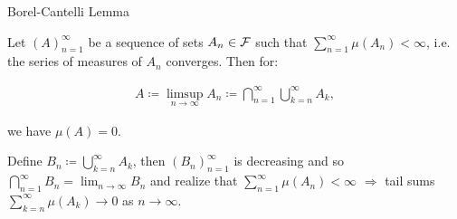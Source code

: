 \begin{lemma}{4.4}{Borel-Cantelli Lemma}

    Let $(A)_{n=1}^{\infty}$ be a sequence of sets $A_n \in \mathcal{F}$ such that $\sum_{n=1}^{\infty} \mu(A_n) < \infty$, i.e. the series of measures of $A_n$ converges. Then for:

        \begin{align*}
            A \coloneqq \limsup_{n \to \infty} A_n \coloneqq \bigcap_{n=1}^{\infty} \bigcup_{k=n}^{\infty} A_k,
        \end{align*}

    we have $\mu(A) = 0$.

    \Hint Define $B_n \coloneqq \bigcup_{k=n}^{\infty} A_k$, then $(B_n)_{n=1}^\infty$ is decreasing and so $\bigcap_{n=1}^{\infty} B_n = \lim_{n \to \infty} B_n$ and realize that $\sum_{n=1}^{\infty} \mu(A_n) < \infty$ $\Rightarrow$ tail sums $\sum_{k=n}^{\infty} \mu(A_k) \to 0$ as $n \to \infty$.

\end{lemma}

